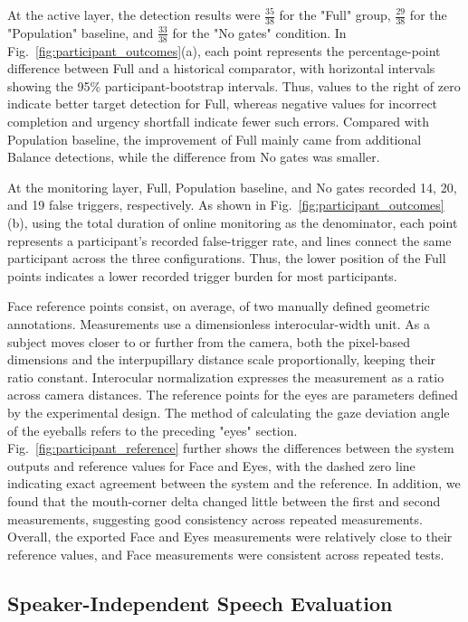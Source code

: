\documentclass[conference]{IEEEtran}
\providecommand{\revisioncolor}{black}
\DeclareRobustCommand{\revised}[1]{{\color{\revisioncolor}#1}}
\begin{document}
At the active layer, the detection results were $\frac{35}{38}$ for the "Full" group, $\frac{29}{38}$ for the "Population" baseline, and $\frac{33}{38}$ for the "No gates" condition. In Fig.~\ref{fig:participant_outcomes}(a), each point represents the percentage-point difference between Full and a historical comparator, with horizontal intervals showing the 95\% participant-bootstrap intervals.
Thus, values to the right of zero indicate better target detection for Full, whereas negative values for incorrect completion and urgency shortfall indicate fewer such errors. Compared with Population baseline, the improvement of Full mainly came from additional Balance detections, while the difference from No gates was smaller.


At the monitoring layer, Full, Population baseline, and No gates recorded 14, 20, and 19 false triggers, respectively. As shown in Fig.~\ref{fig:participant_outcomes}(b), using the total duration of online monitoring as the denominator, each point represents a participant's recorded false-trigger rate, and lines connect the same participant across the three configurations. Thus, the lower position of the Full points indicates a lower recorded trigger burden for most participants.


Face reference points consist, on average, of two manually defined geometric annotations. \revised{Measurements use a dimensionless interocular-width unit.} As a subject moves closer to or further from the camera, both the pixel-based dimensions and the interpupillary distance scale proportionally, keeping their ratio constant. \revised{Interocular normalization expresses the measurement as a ratio across camera distances.} The reference points for the eyes are parameters defined by the experimental design. The method of calculating the gaze deviation angle of the eyeballs refers to the preceding "eyes" section.
Fig.~\ref{fig:participant_reference} further shows the differences between the system outputs and reference values for Face and Eyes, with the dashed zero line indicating exact agreement between the system and the reference. In addition, we found that the mouth-corner delta changed little between the first and second measurements, suggesting good consistency across repeated measurements. \revised{Overall, the exported Face and Eyes measurements were relatively close to their reference values, and Face measurements were consistent across repeated tests.}

\subsection{Speaker-Independent Speech Evaluation}
\end{document}
